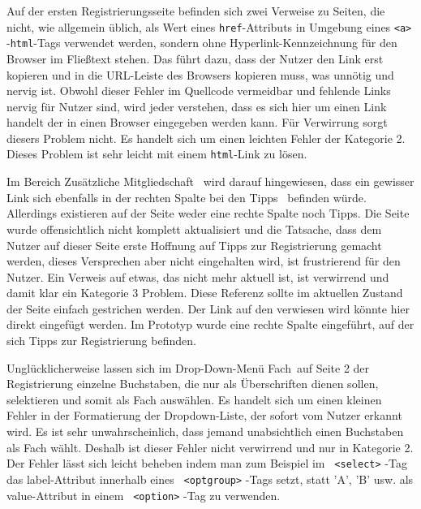 { Auf der ersten Registrierungsseite befinden sich zwei Verweise zu Seiten, die nicht, wie allgemein üblich, als Wert eines \texttt{href}-Attributs in Umgebung eines \texttt{\textless a\textgreater} -\texttt{html}-Tags verwendet werden, sondern ohne Hyperlink-Kennzeichnung für den Browser im Fließtext stehen. Das führt dazu, dass der Nutzer den Link erst kopieren und in die URL-Leiste des Browsers kopieren muss, was unnötig und nervig ist.
}
{ Obwohl dieser Fehler im Quellcode vermeidbar und fehlende Links nervig für Nutzer sind, wird jeder verstehen, dass es sich hier um einen Link handelt der in einen Browser eingegeben werden kann. Für Verwirrung sorgt diesers Problem nicht. Es handelt sich um einen leichten Fehler der Kategorie 2.
}
{ Dieses Problem ist sehr leicht mit einem \texttt{html}-Link zu lösen.
} 

{ Im Bereich \glqq Zusätzliche Mitgliedschaft\grqq ~ wird darauf hingewiesen, dass ein gewisser Link sich ebenfalls in der \glqq rechten Spalte bei den Tipps\grqq ~ befinden würde. Allerdings existieren auf der Seite weder eine rechte Spalte noch Tipps. Die Seite wurde offensichtlich nicht komplett aktualisiert und die Tatsache, dass dem Nutzer auf dieser Seite erste Hoffnung auf Tipps zur Registrierung gemacht werden, dieses Versprechen aber nicht eingehalten wird, ist frustrierend für den Nutzer.
}
{ Ein Verweis auf etwas, das nicht mehr aktuell ist, ist verwirrend und damit klar ein Kategorie 3 Problem.
}
{ Diese Referenz sollte im aktuellen Zustand der Seite einfach gestrichen werden. Der Link auf den verwiesen wird könnte hier direkt eingefügt werden. Im Prototyp wurde eine rechte Spalte eingeführt, auf der sich Tipps zur Registrierung befinden.
} 

{ Unglücklicherweise lassen sich im Drop-Down-Menü \glqq Fach\grqq ~auf Seite 2 der Registrierung einzelne Buchstaben, die nur als Überschriften dienen sollen, selektieren und somit als Fach auswählen. 
}
{ Es handelt sich um einen kleinen Fehler in der Formatierung der Dropdown-Liste, der sofort vom Nutzer erkannt wird. Es ist sehr unwahrscheinlich, dass jemand unabsichtlich einen Buchstaben als Fach wählt. Deshalb ist dieser Fehler nicht verwirrend und nur in Kategorie 2.
}
{ Der Fehler lässt sich leicht beheben indem man zum Beispiel im \texttt{ \textless select\textgreater} -Tag das label-Attribut innerhalb eines \texttt{ \textless optgroup\textgreater  } -Tags setzt, statt 'A', 'B' usw. als value-Attribut in einem \texttt{ \textless option\textgreater} -Tag zu verwenden.
} 



